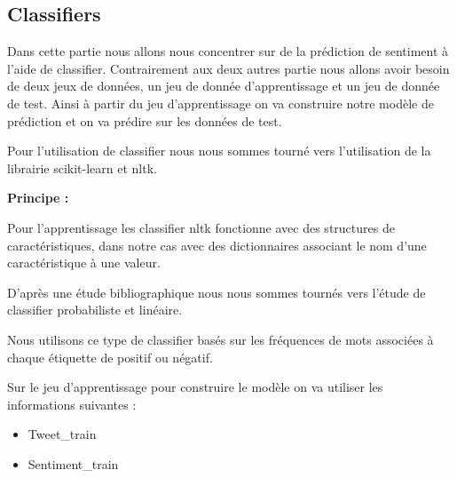 \subsection{Classifiers}

\par Dans cette partie nous allons nous concentrer sur de la prédiction de sentiment à l'aide de classifier. Contrairement aux deux autres partie nous allons avoir besoin de deux jeux de données, un jeu de donnée d'apprentissage et un jeu de donnée de test. Ainsi à partir du jeu d'apprentissage on va construire notre modèle de prédiction et on va prédire sur les données de test. \\

\par Pour l'utilisation de classifier nous nous sommes tourné vers l'utilisation de la librairie scikit-learn et nltk. \\

\par \textbf{Principe : } \\
\par Pour l'apprentissage les classifier nltk fonctionne avec des structures de caractéristiques, dans notre cas avec des dictionnaires associant le nom d'une caractéristique à une valeur. 
\par D'après une étude bibliographique nous nous sommes tournés vers l'étude de classifier probabiliste et linéaire.
\par Nous utilisons ce type de classifier basés sur les fréquences de mots associées à chaque étiquette de positif ou négatif. \\

\par Sur le jeu d'apprentissage pour construire le modèle on va utiliser les informations suivantes : \\
\begin{itemize}
	\item Tweet\_train
	\item Sentiment\_train \\
\end{itemize}


